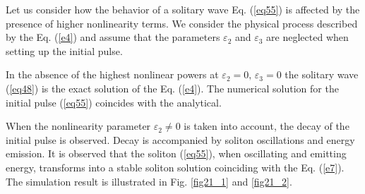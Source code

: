 \documentclass[preprint,12pt]{elsarticle}
\begin{document}
Let us consider how the behavior of a solitary wave Eq. (\ref{eq55}) is affected by the presence of higher nonlinearity terms.
We consider the physical process described by the Eq. (\ref{e4}) and assume that the parameters \(\varepsilon_{2}\) and \(\varepsilon_{3}\) are neglected when setting up the initial pulse.

In the absence of the highest nonlinear powers at \(\varepsilon_{2}=0,\,\varepsilon_{3}=0\) the solitary wave (\ref{eq48}) is the exact solution of the Eq. (\ref{e4}). The numerical solution for the initial pulse (\ref{eq55}) coincides with the analytical.

When the nonlinearity parameter \(\varepsilon_{2}\ne 0\) is taken into account, the decay of the initial pulse is observed. Decay is accompanied by soliton oscillations and energy emission. It is observed that the soliton (\ref{eq55}), when oscillating and emitting energy, transforms into a stable soliton solution coinciding with the Eq. (\ref{e7}). The simulation result is illustrated in Fig. \ref{fig21_1} and \ref{fig21_2}.
\end{document}
